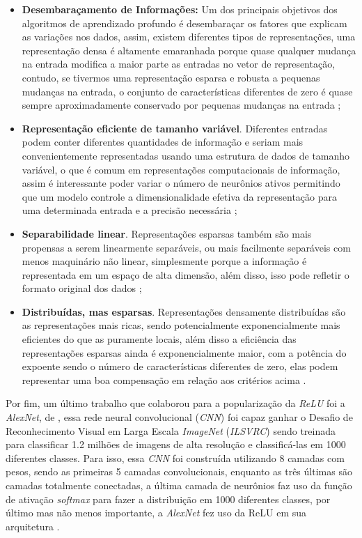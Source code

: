 \begin{itemize}
    \item \textbf{Desembaraçamento de Informações:} Um dos principais objetivos dos algoritmos de aprendizado profundo é desembaraçar os fatores que explicam as variações nos dados, assim, existem diferentes tipos de representações, uma representação densa é altamente emaranhada porque quase qualquer mudança na entrada modifica a maior parte as entradas no vetor de representação, contudo, se tivermos uma representação esparsa e robusta a pequenas mudanças na entrada, o conjunto de características diferentes de zero é quase sempre aproximadamente conservado por pequenas mudanças na entrada \parencite{Glorot};
    \item \textbf{Representação eficiente de tamanho variável}. Diferentes entradas podem conter diferentes quantidades de informação e seriam mais convenientemente representadas usando uma estrutura de dados de tamanho variável, o que é comum em representações computacionais de informação, assim é interessante poder variar o número de neurônios ativos permitindo que um modelo controle a dimensionalidade efetiva da representação para uma determinada entrada e a precisão necessária \parencite{Glorot};
    \item \textbf{Separabilidade linear}. Representações esparsas também são mais propensas a serem linearmente separáveis, ou mais facilmente separáveis com menos maquinário não linear, simplesmente porque a informação é representada em um espaço de alta dimensão, além disso, isso pode refletir o formato original dos dados \parencite{Glorot};
    \item \textbf{Distribuídas, mas esparsas}. Representações densamente distribuídas são as representações mais ricas, sendo potencialmente exponencialmente mais eficientes do que as puramente locais, além disso a eficiência das representações esparsas ainda é exponencialmente maior, com a potência do expoente sendo o número de características diferentes de zero, elas podem representar uma boa compensação em relação aos critérios acima \parencite{Glorot}.
\end{itemize}

Por fim, um último trabalho que colaborou para a popularização da \textit{ReLU} foi a \textit{AlexNet}, de \textcite{AlexNet}, essa rede neural convolucional (\textit{CNN}) foi capaz ganhar o Desafio de Reconhecimento Visual em Larga Escala \textit{ImageNet} (\textit{ILSVRC}) sendo treinada para classificar 1.2 milhões de imagens de alta resolução e classificá-las em 1000 diferentes classes. Para isso, essa \textit{CNN} foi construída utilizando 8 camadas com pesos, sendo as primeiras 5 camadas convolucionais, enquanto as três últimas são camadas totalmente conectadas, a última camada de neurônios faz uso da função de ativação \textit{softmax} para fazer a distribuição em 1000 diferentes classes, por último mas não menos importante, a \textit{AlexNet} fez uso da ReLU em sua arquitetura \parencite{AlexNet}.

